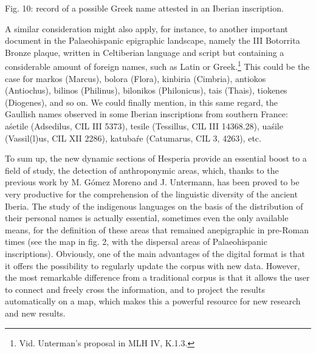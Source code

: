 \documentclass[amsthm,ebook]{saparticle}
\begin{document}
Fig. 10: record of a possible Greek name attested in an Iberian inscription.

A similar consideration might also apply, for instance, to another important document in the Palaeohispanic epigraphic
landscape, namely the III Botorrita Bronze plaque, written in Celtiberian language and script but containing a
considerable amount of foreign names, such as Latin or Greek.\footnote{ Vid. Unterman’s proposal in MLH IV, K.1.3. }
This could be the case for markos (Marcus), bolora (Flora), kinbiria (Cimbria), antiokos (Antiochus), bilinos
(Philinus), bilonikos (Philonicus), tais (Thais), tiokenes (Diogenes), and so on. We could finally mention, in this
same regard, the Gaullish names observed in some Iberian inscriptions from southern France: aśetile (Adsedilus, CIL III
5373), tesile (Tessillus, CIL III 14368.28), uaśile (Vassil(l)us, CIL XII 2286), katubaŕe (Catumarus, CIL 3, 4263),
etc.

To sum up, the new dynamic sections of Hesperia provide an essential boost to a field of study, the detection of
anthroponymic areas, which, thanks to the previous work by M. Gómez Moreno and J. Untermann, has been proved to be very
productive for the comprehension of the linguistic diversity of the ancient Iberia. The study of the indigenous
languages on the basis of the distribution of their personal names is actually essential, sometimes even the only
available means, for the definition of these areas that remained anepigraphic in pre-Roman times (see the map in fig.
2, with the dispersal areas of Palaeohispanic inscriptions). Obviously, one of the main advantages of the digital
format is that it offers the possibility to regularly update the corpus with new data. However, the most remarkable
difference from a traditional corpus is that it allows the user to connect and freely cross the information, and to
project the results automatically on a map, which makes this a powerful resource for new research and new results.



\end{document}
